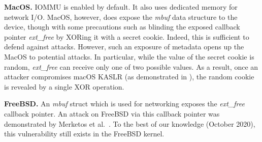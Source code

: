\smallskip
\noindent\textbf{MacOS.} IOMMU is enabled by default. It also uses dedicated memory for network I/O. MacOS, however, does expose the \textit{mbuf} data structure to the device, though with some precautions such as blinding the exposed callback pointer \textit{ext\_free} by XORing it with a secret cookie.
Indeed, this is sufficient to defend against \simple attacks. However, such an exposure of metadata opens up the MacOS to potential \compound attacks.
In particular, while the value of the secret cookie is random, \textit{ext\_free} can receive only one of two possible values. As a result, once an attacker compromises macOS KASLR (as demonstrated in \cite{thunder}), the random cookie is revealed by a single XOR operation.  

\smallskip
\noindent\textbf{FreeBSD.} An \textit{mbuf} struct which is used for networking exposes the \textit{ext\_free} callback pointer. An attack on FreeBSD via this callback pointer was demonstrated by Merketos et al.~\cite{thunder}. To the best of our knowledge (October 2020), this vulnerability still exists in the FreeBSD kernel.

